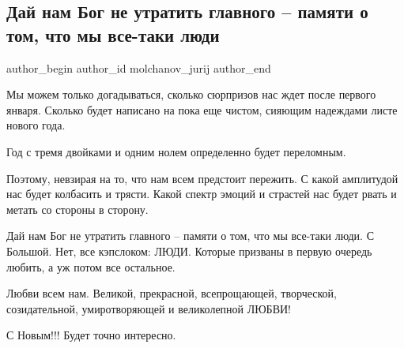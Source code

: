  
 
 
 
 
 
\subsection{Дай нам Бог не утратить главного – памяти о том, что мы все-таки люди}
\label{sec:31_12_2021.fb.molchanov_jurij.1.ljudi}
 
\ifcmt
 author_begin
   author_id molchanov_jurij
 author_end
\fi

Мы можем только догадываться, сколько сюрпризов нас ждет после первого января.
Сколько будет написано на пока еще чистом, сияющим надеждами листе нового года.

Год с тремя двойками и одним нолем определенно будет переломным.

Поэтому, невзирая на то, что нам всем предстоит пережить. С какой амплитудой
нас будет колбасить и трясти. Какой спектр эмоций и страстей нас будет рвать и
метать со стороны в сторону.

Дай нам Бог не утратить главного – памяти о том, что мы все-таки люди. С
Большой. Нет, все  кэпслоком: ЛЮДИ. Которые призваны в первую очередь любить, а
уж потом все остальное.

Любви всем нам. Великой, прекрасной, всепрощающей, творческой, созидательной,
умиротворяющей и великолепной ЛЮБВИ!

С Новым!!! Будет точно интересно.

